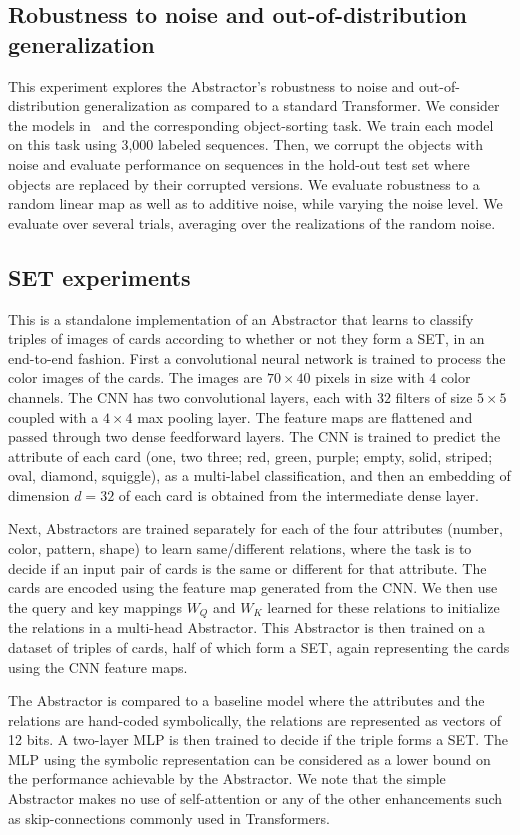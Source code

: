 \subsection{Robustness to noise and out-of-distribution generalization}
This experiment explores the Abstractor's robustness to noise and out-of-distribution generalization as compared to a standard Transformer. We consider the models in~ and the corresponding object-sorting task. We train each model on this task using 3,000 labeled sequences. Then, we corrupt the objects with noise and evaluate performance on sequences in the hold-out test set where objects are replaced by their corrupted versions. We evaluate robustness to a random linear map as well as to additive noise, while varying the noise level. We evaluate over several trials, averaging over the realizations of the random noise.

\subsection{SET experiments}

This is a standalone implementation of an Abstractor that learns to classify triples of images of cards according 
to whether or not they form a SET, in an end-to-end fashion. First a convolutional neural network is trained to process the color images of the cards. The images are $70 \times 40$ pixels in size with $4$ color channels. The CNN has two convolutional layers, each with $32$ filters of size $5\times 5$ coupled with a $4\times 4$ max pooling layer. The feature maps are flattened and passed through two dense feedforward layers. The CNN is trained to predict the attribute of each card (one, two three; red, green, purple; empty, solid, striped; oval, diamond, squiggle), as a multi-label classification, and then an embedding of dimension $d=32$ of each card is obtained from the intermediate dense layer. 

Next, Abstractors are trained separately for each of the four attributes (number, color, pattern, shape) to learn same/different relations, where the task is to decide if an input pair of cards is the same or different for that attribute. The cards are encoded using the feature map generated from the CNN. We then use the query and key mappings $W_Q$ and $W_K$ learned for these relations to initialize the relations in a multi-head Abstractor. This Abstractor is then trained on a dataset of triples of cards, half of which form a SET, again representing the cards using the CNN feature maps.

The Abstractor is compared to a baseline model where the attributes and the relations are hand-coded symbolically, the relations are represented as vectors of 12 bits. A two-layer MLP is then trained to decide if the triple forms a SET. The MLP using the symbolic representation can be considered as a lower bound on the performance achievable by the Abstractor. We note that the simple Abstractor makes no use of self-attention or any of the other enhancements such as skip-connections commonly used in Transformers.
